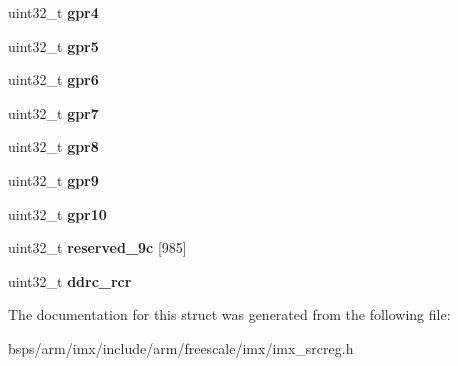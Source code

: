 \begin{DoxyCompactItemize}
\mbox{\label{structimx__src_a56318245f65fad30ea8d9aa835b0831d}} 
uint32\+\_\+t {\bfseries gpr4}
\item 
\mbox{\label{structimx__src_ada7daf731c77953e511f21119dd6cff9}} 
uint32\+\_\+t {\bfseries gpr5}
\item 
\mbox{\label{structimx__src_ad93fa665f906eea1412bd4a32997bb93}} 
uint32\+\_\+t {\bfseries gpr6}
\item 
\mbox{\label{structimx__src_a25303543cb97434453b186284eaa2174}} 
uint32\+\_\+t {\bfseries gpr7}
\item 
\mbox{\label{structimx__src_a190481f8228d460747d0dc0ccde88470}} 
uint32\+\_\+t {\bfseries gpr8}
\item 
\mbox{\label{structimx__src_a0a2a2bf8c23d87f3b37f2e86faadf92f}} 
uint32\+\_\+t {\bfseries gpr9}
\item 
\mbox{\label{structimx__src_a3c72a26d4e837bd87b3c5d82a3922652}} 
uint32\+\_\+t {\bfseries gpr10}
\item 
\mbox{\label{structimx__src_a3bc953b9546878bd22d133fe5e7ac258}} 
uint32\+\_\+t {\bfseries reserved\+\_\+9c} \mbox{[}985\mbox{]}
\item 
\mbox{\label{structimx__src_ab9c4e85253db03dc1bd4e67cc9396631}} 
uint32\+\_\+t {\bfseries ddrc\+\_\+rcr}
\end{DoxyCompactItemize}


The documentation for this struct was generated from the following file\+:\begin{DoxyCompactItemize}
\item 
bsps/arm/imx/include/arm/freescale/imx/imx\+\_\+srcreg.\+h\end{DoxyCompactItemize}
